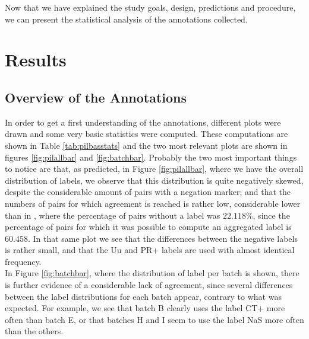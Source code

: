 Now that we have explained the study goals, design, predictions and procedure, we can present the statistical analysis of the annotations collected.\\

\section{Results}
\subsection{Overview of the Annotations}
\label{subsect:piloverview}
In order to get a first understanding of the annotations, different plots were drawn and some very basic statistics were computed. These computations are shown in Table \ref{tab:pilbasstats} and the two most relevant plots are shown in figures \ref{fig:pilallbar} and \ref{fig:batchbar}. Probably the two most important things to notice are that, as predicted, in Figure \ref{fig:pilallbar}, where we have the overall distribution of labels, we observe that this distribution is quite negatively skewed, despite the considerable amount of pairs with a negation marker; and that the numbers of pairs for which agreement is reached is rather low, considerable lower than in \citet{de2012did}, where the percentage of pairs without a label was $22.118\%$, since the percentage of pairs for which it was possible to compute an aggregated label is $60.458$. In that same plot we see that the differences between the negative labels is rather small, and that the Uu and PR+ labels are used with almost identical frequency.\\ 

In Figure \ref{fig:batchbar}, where the distribution of label per batch is shown, there is further evidence of a considerable lack of agreement, since several differences between the label distributions for each batch appear, contrary to what was expected. For example, we see that batch B clearly uses the label CT+ more often than batch E, or that batches H and I seem to use the label NaS more often than the others.\\

